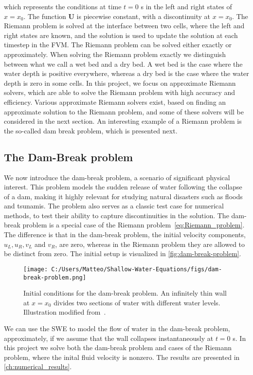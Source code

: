 which represents the conditions at time $t = 0$ s in the left and right states of $x = x_0$.
The function $\mathbf{U}$ is piecewise constant, with a discontinuity at $x = x_0$.
The Riemann problem is solved at the interface between two cells, where the left and right states are known, and the solution is used to update the solution at each timestep in the FVM.
The Riemann problem can be solved either exactly or approximately.
When solving the Riemann problem exactly we distinguish between what we call a wet bed and a dry bed.
A wet bed is the case where the water depth is positive everywhere, whereas a dry bed is the case where the water depth is zero in some cells.
In this project, we focus on approximate Riemann solvers, which are able to solve the Riemann problem with high accuracy and efficiency.
Various approximate Riemann solvers exist, based on finding an approximate solution to the Riemann problem, and some of these solvers will be considered in the next section.
An interesting example of a Riemann problem is the so-called dam break problem, which is presented next.

\subsection{The Dam-Break problem}
We now introduce the dam-break problem, a scenario of significant physical interest.
This problem models the sudden release of water following the collapse of a dam, making it highly relevant for studying natural disasters such as floods and tsunamis.
The problem also serves as a classic test case for numerical methods, to test their ability to capture discontinuities in the solution.
The dam-break problem is a special case of the Riemann problem~\eqref{eq:Riemann_problem}.
The difference is that in the dam-break problem, the initial velocity components, $u_L, u_R, v_L$ and $v_R$, are zero, whereas in the Riemann problem they are allowed to be distinct from zero.
The initial setup is visualized in \autoref{fig:dam-break-problem}.
\begin{figure}[H]
    \centering
    \texttt{[image: C:/Users/Matteo/Shallow-Water-Equations/figs/dam-break-problem.png]}
    \caption{Initial conditions for the dam-break problem. An infinitely thin wall at $x=x_0$ divides two sections of water with different water levels. Illustration modified from~\cite{Toro2024}.}\label{fig:dam-break-problem}
\end{figure} 
We can use the SWE to model the flow of water in the dam-break problem, approximately, if we assume that the wall collapses instantaneously at $t=0$ s.
In this project we solve both the dam-break problem and cases of the Riemann problem, where the inital fluid velocity is nonzero.
The results are presented in \autoref{ch:numerical_results}.

